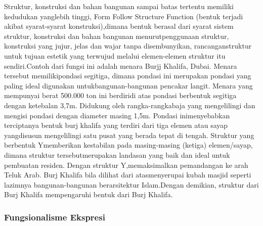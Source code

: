 \documentclass[../manperil.tex]{subfiles}
\begin{document}
Struktur, konstruksi dan bahan bangunan sampai batas tertentu memiliki kedudukan yanglebih tinggi, Form Follow Structure Function (bentuk terjadi akibat syarat-syarat konstruksi),dimana bentuk berasal dari syarat sistem struktur, konstruksi dan bahan bangunan menurutpenggunaan struktur, konstruksi yang jujur, jelas dan wajar tanpa disembunyikan, rancanganstruktur untuk tujuan estetik yang terwujud melalui elemen-elemen struktur itu sendiri.Contoh dari fungsi ini adalah menara Burjj Khalifa, Dubai. Menara tersebut memilikipondasi segitiga, dimana pondasi ini merupakan pondasi yang paling ideal digunakan untukbangunan-bangunan pencakar langit. Menara yang mempunyai berat 500.000 ton ini berdiridi atas pondasi berbentuk segitiga dengan ketebalan 3,7m. Didukung oleh rangka-rangkabaja yang mengelilingi dan mengisi pondasi dengan diameter masing 1,5m. Pondasi inimenyebabkan terciptanya bentuk burj khalifa yang terdiri dari tiga elemen atau sayap yangdisusun mengelilingi satu pusat yang berada tepat di tengah. Struktur yang berbentuk Ymemberikan kestabilan pada masing-masing (ketiga) elemen/sayap, dimana struktur tersebutmerupakan landasan yang baik dan ideal untuk pembuatan residen. Dengan struktur Y,memaksimalkan pemandangan ke arah Teluk Arab. Burj Khalifa bila dilihat dari atasmenyerupai kubah masjid seperti lazimnya bangunan-bangunan berarsitektur Islam.Dengan demikian, struktur dari Burj Khalifa mempengaruhi bentuk dari Burj Khalifa.

\subsubsection{Fungsionalisme Ekspresi}%
\label{ssub:fungsionalisme_ekspresi}
\end{document}
